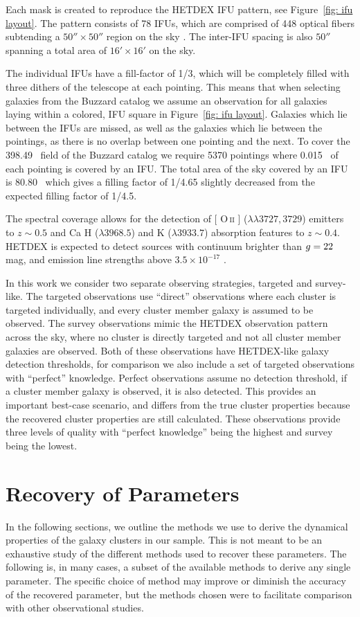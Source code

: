 \documentclass[fleqn,usenatbib]{mnras}
\makeatletter
\DeclareRobustCommand{\ion}[2]{%
\relax\ifmmode
\ifx\testbx\f@series
{\mathbf{#1\,\mathsc{#2}}}\else
{\mathrm{#1\,\mathsc{#2}}}\fi
\else\textup{#1\,{\mdseries\textsc{#2}}}%
\fi}
\makeatother
\begin{document}
Each mask is created to reproduce the HETDEX IFU pattern, see Figure~\ref{fig: ifu layout}. The pattern consists of 78 IFUs, which are comprised of 448 optical fibers subtending a $50'' \times 50''$ region on the sky \citep{Kelz2014}. The inter-IFU spacing is also $50''$ spanning a total area of $16'\times 16'$ on the sky. 

The individual IFUs have a fill-factor of 1/3, which will be completely filled with three dithers of the telescope at each pointing. This means that when selecting galaxies from the Buzzard catalog we assume an observation for all galaxies laying within a colored, IFU square in Figure~\ref{fig: ifu layout}. Galaxies which lie between the IFUs are missed, as well as the galaxies which lie between the pointings, as there is no overlap between one pointing and the next. To cover the 398.49 \degsq\ field of the Buzzard catalog we require 5370 pointings where 0.015 \degsq\ of each pointing is covered by an IFU. The total area of the sky covered by an IFU is 80.80 \degsq\ which gives a filling factor of 1/4.65 slightly decreased from the expected filling factor of 1/4.5.

The spectral coverage allows for the detection of [\ion{O}{ii}] ($\lambda\lambda 3727,3729$) emitters to $z\sim 0.5$ and Ca H ($\lambda 3968.5$) and K ($\lambda 3933.7$) absorption features to $z\sim 0.4$. HETDEX is expected to detect sources with continuum brighter than $\hbox{$g$}=22$ mag, and emission line strengths above $3.5\times10^{-17}$ \ergscm.

In this work we consider two separate observing strategies, targeted and survey-like. The targeted observations use ``direct'' observations where each cluster is targeted individually, and every cluster member galaxy is assumed to be observed. The survey observations mimic the HETDEX observation pattern across the sky, where no cluster is directly targeted and not all cluster member galaxies are observed. Both of these observations have HETDEX-like galaxy detection thresholds, for comparison we also include a set of targeted observations with ``perfect'' knowledge. Perfect observations assume no detection threshold, if a cluster member galaxy is observed, it is also detected. This provides an important best-case scenario, and differs from the true cluster properties because the recovered cluster properties are still calculated. These observations provide three levels of quality with ``perfect knowledge'' being the highest and survey being the lowest.

\section{Recovery of Parameters}\label{sec:recovery}
 In the following sections, we outline the methods we use to derive the dynamical properties of the galaxy clusters in our sample. This is not meant to be an exhaustive study of the different methods used to recover these parameters. The following is, in many cases, a subset of the available methods to derive any single parameter. The specific choice of method may improve or diminish the accuracy of the recovered parameter, but the methods chosen were to facilitate comparison with other observational studies. 
\end{document}
